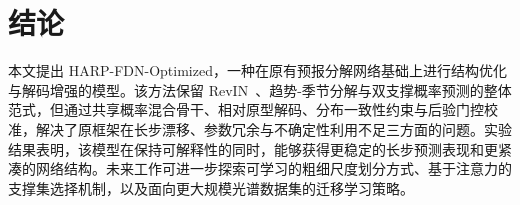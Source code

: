 \documentclass[journal]{IEEEtran}
\begin{document}
\section{结论}
\label{sec:conclusion}

本文提出 HARP-FDN-Optimized，一种在原有预报分解网络基础上进行结构优化与解码增强的模型。该方法保留 RevIN~\cite{revin}、趋势-季节分解与双支撑概率预测的整体范式，但通过共享概率混合骨干、相对原型解码、分布一致性约束与后验门控校准，解决了原框架在长步漂移、参数冗余与不确定性利用不足三方面的问题。实验结果表明，该模型在保持可解释性的同时，能够获得更稳定的长步预测表现和更紧凑的网络结构。未来工作可进一步探索可学习的粗细尺度划分方式、基于注意力的支撑集选择机制，以及面向更大规模光谱数据集的迁移学习策略。
\end{document}
